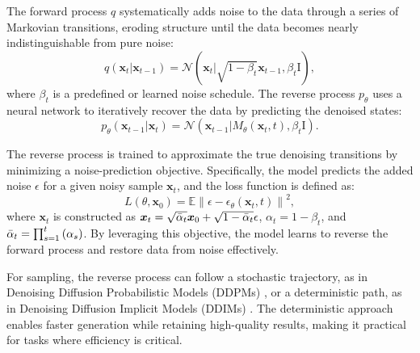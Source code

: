 The forward process $q$ systematically adds noise to the data through a series of Markovian transitions, eroding structure until the data becomes nearly indistinguishable from pure noise:
\begin{equation}\label{eq:forward}
    q\left(\boldsymbol{x}_t|\boldsymbol{x}_{t-1}\right)=\mathcal{N}\left(\boldsymbol{x}_t|\sqrt{1-\beta_t}\boldsymbol{x}_{t-1},\beta_t\boldsymbol{\mathrm{I}}\right),
\end{equation}
where $\beta_t$ is a predefined or learned noise schedule. The reverse process $p_\theta$ uses a neural network to iteratively recover the data by predicting the denoised states:
\begin{equation}\label{eq:reverse}
    p_\theta\left(\boldsymbol{x}_{t-1}|\boldsymbol{x}_t\right)=\mathcal{N}\left(\boldsymbol{x}_{t-1}|M_\theta\left(\boldsymbol{x}_t,t\right),\beta_t\boldsymbol{\mathrm{I}}\right).
\end{equation}

The reverse process is trained to approximate the true denoising transitions by minimizing a noise-prediction objective. Specifically, the model predicts the added noise $\epsilon$ for a given noisy sample $\boldsymbol{x}_t$, and the loss function is defined as:
\begin{equation}\label{eq:ddpm_loss}
    L\left(\theta,\boldsymbol{x}_0\right)=\mathbb{E}\left\|\epsilon-\epsilon_\theta\left(\boldsymbol{x}_t, t\right)\right\|^2,
\end{equation}
where $\boldsymbol{x}_t$ is constructed as $\boldsymbol{x}_t=\sqrt{\Bar{\alpha}_t}\boldsymbol{x}_0+\sqrt{1-\Bar{\alpha}_t}\epsilon$, $\alpha_t=1-\beta_t$, and $\Bar{\alpha}_t=\prod_{s=1}^t\left(\alpha_s\right)$. By leveraging this objective, the model learns to reverse the forward process and restore data from noise effectively.

For sampling, the reverse process can follow a stochastic trajectory, as in Denoising Diffusion Probabilistic Models (DDPMs) \cite{Ho2020}, or a deterministic path, as in Denoising Diffusion Implicit Models (DDIMs) \cite{Song2021}. The deterministic approach enables faster generation while retaining high-quality results, making it practical for tasks where efficiency is critical.


